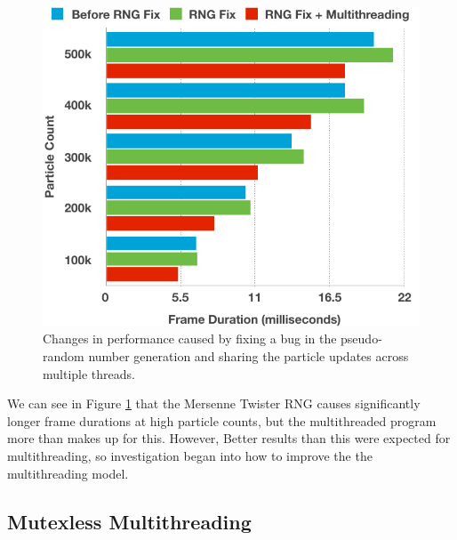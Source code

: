 \documentclass[11pt, a4paper, twocolumn]{article}
\begin{document}
\begin{figure}[h]
\includegraphics[width=\linewidth]{initial-rng-multithread}
\caption{Changes in performance caused by fixing a bug in the pseudo-random number generation and sharing the particle updates across multiple threads.}
\label{fig:initial-rng-multithread}
\end{figure}

We can see in Figure \ref{fig:initial-rng-multithread} that the Mersenne Twister RNG causes significantly longer frame durations at high particle counts, but the multithreaded program more than makes up for this. However, Better results than this were expected for multithreading, so investigation began into how to improve the the multithreading model.

\subsection{Mutexless Multithreading}
\end{document}

